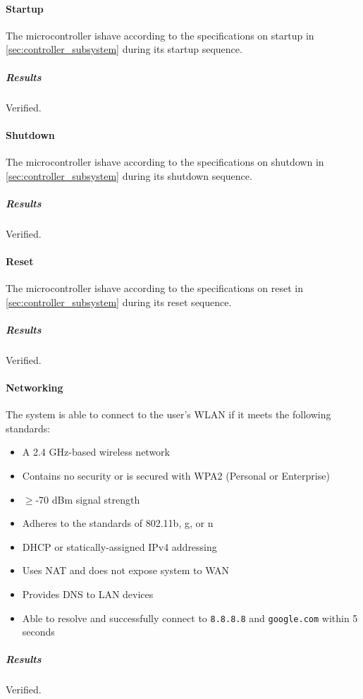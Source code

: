 \paragraph{Startup} The microcontroller ishave according to the specifications on startup in \autoref{sec:controller_subsystem} during its startup sequence.
\subparagraph{Results} Verified.

\paragraph{Shutdown} The microcontroller ishave according to the specifications on shutdown in \autoref{sec:controller_subsystem} during its shutdown sequence.
\subparagraph{Results} Verified.

\paragraph{Reset} The microcontroller ishave according to the specifications on reset in \autoref{sec:controller_subsystem} during its reset sequence.
\subparagraph{Results} Verified.

\paragraph{Networking} The system is able to connect to the user's WLAN if it meets the following standards:
\begin{itemize}
    \item A 2.4 GHz-based wireless network
    \item Contains no security or is secured with WPA2 (Personal or Enterprise)
    \item $\geq$-70 dBm signal strength
    \item Adheres to the standards of 802.11b, g, or n
    \item DHCP or statically-assigned IPv4 addressing
    \item Uses NAT and does not expose system to WAN
    \item Provides DNS to LAN devices
    \item Able to resolve and successfully connect to \texttt{8.8.8.8} and \texttt{google.com} within 5 seconds
\end{itemize}
\subparagraph{Results} Verified.